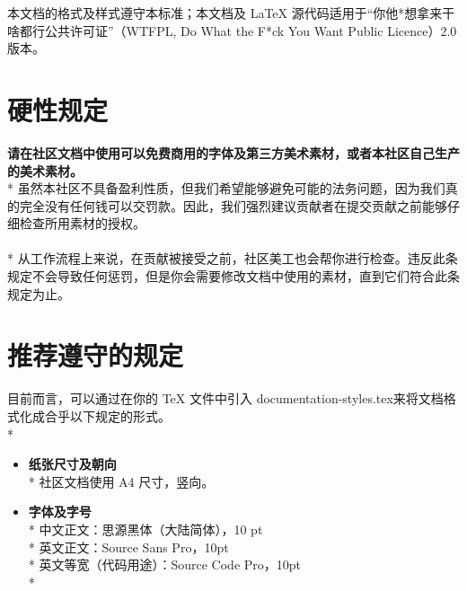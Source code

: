     本文档的格式及样式遵守本标准；本文档及 LaTeX 源代码适用于“你他*想拿来干啥都行公共许可证”（WTFPL, Do What the F*ck You Want Public Licence）2.0 版本。


    \section{硬性规定}
    
    \textbf{请在社区文档中使用可以免费商用的字体及第三方美术素材，或者本社区自己生产的美术素材。}\\*
    虽然本社区不具备盈利性质，但我们希望能够避免可能的法务问题，因为我们真的完全没有任何钱可以交罚款。因此，我们强烈建议贡献者在提交贡献之前能够仔细检查所用素材的授权。
    \\
    \\*
    从工作流程上来说，在贡献被接受之前，社区美工也会帮你进行检查。违反此条规定不会导致任何惩罚，但是你会需要修改文档中使用的素材，直到它们符合此条规定为止。


    \section{推荐遵守的规定}
    目前而言，可以通过在你的 TeX 文件中引入 \ttfamily documentation-styles.tex\rmfamily 来将文档格式化成合乎以下规定的形式。\\*

    \begin{itemize}
        \item\textbf{\large{纸张尺寸及朝向}}\\*
        社区文档使用 A4 尺寸，竖向。
        \\
        \item\textbf{\large{字体及字号}}\\*
        中文正文：思源黑体（大陆简体），10 pt\\*
        英文正文：Source Sans Pro，10pt\\*
        英文等宽（代码用途）：\ttfamily Source Code Pro，10pt \rmfamily\\*
        \\
    \end{itemize}    


